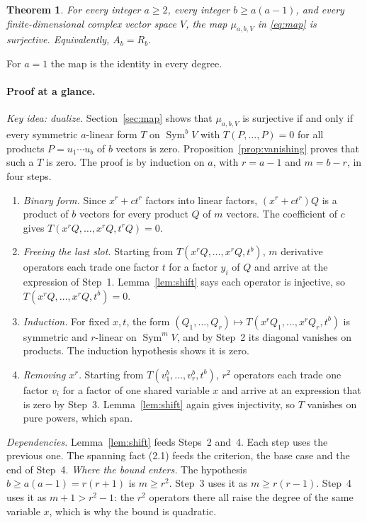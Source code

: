 \documentclass[11pt]{article}
\newtheorem{theorem}{Theorem}
\theoremstyle{remark}
\DeclareMathOperator{\Sym}{Sym}
\begin{document}
\begin{theorem}\label{thm:main}
For every integer $a\ge2$, every integer $b\ge a(a-1)$, and every
finite-dimensional complex vector space $V$, the map
$\mu_{a,b,V}$ in \eqref{eq:map} is surjective. Equivalently, $A_b=R_b$.
\end{theorem}

For $a=1$ the map is the identity in every degree.

\paragraph{Proof at a glance.}
\emph{Key idea: dualize.} Section~\ref{sec:map} shows that $\mu_{a,b,V}$ is
surjective if and only if every symmetric $a$-linear form $T$ on $\Sym^bV$
with $T(P,\ldots,P)=0$ for all products $P=u_1\cdots u_b$ of $b$ vectors is
zero. Proposition~\ref{prop:vanishing} proves that such a $T$ is zero. The
proof is by induction on $a$, with $r=a-1$ and $m=b-r$, in four steps.
\begin{enumerate}[leftmargin=2em,itemsep=1pt,topsep=3pt]
\item \emph{Binary form.} Since $x^r+ct^r$ factors into linear factors,
$(x^r+ct^r)Q$ is a product of $b$ vectors for every product $Q$ of $m$
vectors. The coefficient of $c$ gives $T(x^rQ,\ldots,x^rQ,t^rQ)=0$.
\item \emph{Freeing the last slot.} Starting from $T(x^rQ,\ldots,x^rQ,t^b)$,
$m$ derivative operators each trade one factor $t$ for a factor $y_i$ of
$Q$ and arrive at the expression of Step~1. Lemma~\ref{lem:shift} says each operator is injective, so
$T(x^rQ,\ldots,x^rQ,t^b)=0$.
\item \emph{Induction.} For fixed $x,t$, the form
$(Q_1,\ldots,Q_r)\mapsto T(x^rQ_1,\ldots,x^rQ_r,t^b)$ is symmetric and
$r$-linear on $\Sym^mV$, and by Step~2 its diagonal vanishes on products. The induction hypothesis shows
it is zero.
\item \emph{Removing $x^r$.} Starting from $T(v_1^b,\ldots,v_r^b,t^b)$,
$r^2$ operators each trade one factor $v_i$ for a factor of one shared
variable $x$ and arrive at an expression that is zero by Step~3. Lemma~\ref{lem:shift} again gives
injectivity, so $T$ vanishes on pure powers, which span.
\end{enumerate}
\emph{Dependencies.} Lemma~\ref{lem:shift} feeds Steps~2 and~4. Each step
uses the previous one. The spanning fact (2.1) feeds the criterion, the base
case and the end of Step~4. \emph{Where the bound enters.} The hypothesis
$b\ge a(a-1)=r(r+1)$ is $m\ge r^2$. Step~3 uses it as $m\ge r(r-1)$. Step~4
uses it as $m+1>r^2-1$: the $r^2$ operators there all raise the degree of
the same variable $x$, which is why the bound is quadratic.
\end{document}
